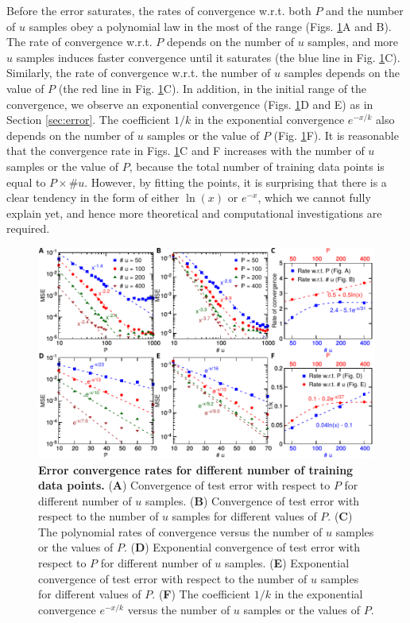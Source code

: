 \documentclass[11pt]{article}
\begin{document}
Before the error saturates, the rates of convergence w.r.t. both $P$ and the number of $u$ samples obey a polynomial law in the most of the range (Figs. \ref{fig:adr_convergence}A and B). The rate of convergence w.r.t. $P$ depends on the number of $u$ samples, and more $u$ samples induces faster convergence until it saturates (the blue line in Fig. \ref{fig:adr_convergence}C). Similarly, the rate of convergence w.r.t. the number of $u$ samples depends on the value of $P$ (the red line in Fig. \ref{fig:adr_convergence}C). In addition, in the initial range of the convergence, we observe an exponential convergence (Figs. \ref{fig:adr_convergence}D and E) as in Section \ref{sec:error}. The coefficient $1/k$ in the exponential convergence $e^{-x/k}$ also depends on the number of $u$ samples or the value of $P$ (Fig. \ref{fig:adr_convergence}F). It is reasonable that the convergence rate in Figs. \ref{fig:adr_convergence}C and F increases with the number of $u$ samples or the value of $P$, because the total number of training data points is equal to $P\times \#u$. However, by fitting the points, it is surprising that there is a clear tendency in the form of either $\ln(x)$ or $e^{-x}$, which we cannot fully explain yet, and hence more theoretical and computational investigations are required.

\begin{figure}[htbp]
\centering
\includegraphics{adr_convergence.pdf}
\caption{\textbf{Error convergence rates for different number of training data points.} (\textbf{A}) Convergence of test error with respect to $P$ for different number of $u$ samples. (\textbf{B}) Convergence of test error with respect to the number of $u$ samples for different values of $P$. (\textbf{C}) The polynomial rates of convergence versus the number of $u$ samples or the values of $P$. (\textbf{D}) Exponential convergence of test error with respect to $P$ for different number of $u$ samples. (\textbf{E}) Exponential convergence of test error with respect to the number of $u$ samples for different values of $P$. (\textbf{F}) The coefficient $1/k$ in the exponential convergence $e^{-x/k}$ versus the number of $u$ samples or the values of $P$.}
\label{fig:adr_convergence}
\end{figure}
\end{document}
